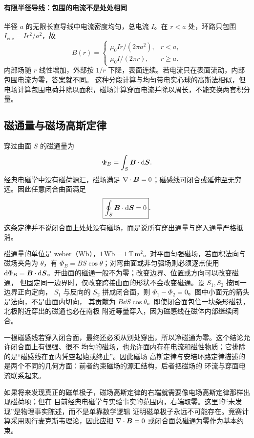 {%
\paragraph{有限半径导线：包围的电流不是处处相同}
半径 $a$ 的无限长直导线中电流密度均匀，总电流 $I$。在 $r<a$ 处，环路只包围
$I_{\mathrm{enc}}=I r^2/a^2$，故
\[
 B(r)=\begin{cases}\mu_0Ir/(2\pi a^2),&r<a,\\
 \mu_0I/(2\pi r),&r\ge a.
 \end{cases}
\]
内部场随 $r$ 线性增加，外部按 $1/r$ 下降，表面连续。若电流只在表面流动，内部包围电流为零，答案就不同。
这种分段计算与均匀带电实心球的高斯法相似，但电场计算包围电荷并除以面积，磁场计算穿面电流并除以周长，不能交换两套积分量。


\subsection{磁通量与磁场高斯定律}


穿过曲面 $S$ 的磁通量为
\begin{equation}
  \Phi_B=\int_S\bm{B}\cdot\mathop{}\!\mathrm d\bm{S}.
\end{equation}
经典电磁学中没有磁荷源汇，磁场满足 $\nabla\cdot\bm{B}=0$；磁感线可闭合或延伸至无穷远。因此任意闭合曲面满足
\begin{equation}
  \boxed{\oint_S\bm{B}\cdot\mathop{}\!\mathrm d\bm{S}=0}.
\end{equation}
这条定律并不说闭合面上处处没有磁场，而是说所有穿出通量与穿入通量严格抵消。

磁通量的单位是 weber（Wb），$1\,\mathrm{Wb}=1\,\mathrm{T\,m^2}$。对平面匀强磁场，若面积法向与
磁场夹角为 $\theta$，有 $\Phi_B=BS\cos\theta$；对弯曲面或非匀强场则必须逐点使用
$\mathop{}\!\mathrm d\Phi_B=\bm{B}\cdot\mathop{}\!\mathrm d\bm{S}$。开曲面的磁通一般不为零；改变边界、位置或方向可以改变磁通，
但固定同一边界时，仅改变跨接曲面的形状不会改变磁通。设 $S_1,S_2$ 按同一边界正向定向，
$S_1$ 与反向的 $S_2$ 拼成闭合面，则 $\Phi_1-\Phi_2=0$。图中小面元的箭头是法向，不是曲面内切向，
其贡献为 $B\dd S\cos\theta$。即使闭合面包住一块条形磁铁，北极附近穿出的磁通也必在南极
附近等量穿入，因为磁感线在磁体内部继续闭合。

一根磁感线若穿入闭合面，最终还必须从别处穿出，所以净磁通为零。这个结论允许闭合面上有很强、很不
均匀的磁场，也允许面内存在电流和磁性物质；它排除的是“磁感线在面内凭空起始或终止”。因此磁场
高斯定律与安培环路定律描述的是两个不同的几何方面：前者约束磁场的源汇结构，后者把磁场的
环流与穿面电流联系起来。

如果将来发现真正的磁单极子，磁场高斯定律的右端就需要像电场高斯定律那样出现磁荷项；但在
目前经典电磁学与实验事实的范围内，右端取零。这里的“未发现”是物理事实陈述，而不是单靠数学逻辑
证明磁单极子永远不可能存在。竞赛计算采用现行麦克斯韦理论，因此应把
$\nabla\cdot\bm{B}=0$ 或闭合面总磁通为零作为基本约束。

}
